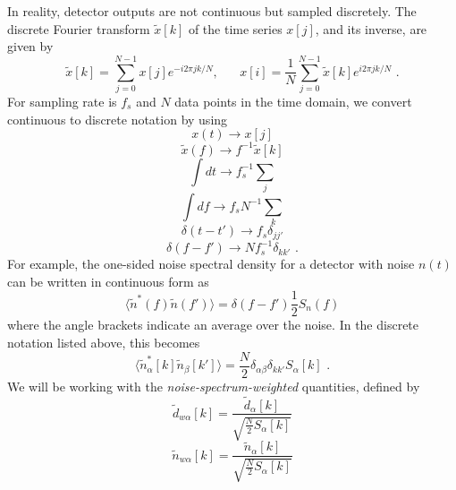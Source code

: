 \documentclass[11pt]{cuthesis}
\newcommand{\fs}{\text{ .}}
\begin{document}
In reality, detector outputs are not continuous but sampled discretely. The discrete Fourier transform $\tilde{x}[k]$ of the time series $x[j]$, and its inverse, are given by
\begin{equation}
\tilde{x}[k]=\sum^{N-1}_{j=0} x[j] e^{-i 2\pi jk/N}, \hspace{20pt}x[i]=\frac{1}{N}\sum^{N-1}_{j=0} \tilde{x}[k] e^{i2 \pi jk/N} \fs
\end{equation}
For sampling rate is $f_s$ and $N$ data points in the time domain, we convert continuous to discrete notation by using
\begin{equation}
x(t)\rightarrow x[j]
\end{equation} 
\begin{equation}
\tilde{x}(f)\rightarrow f^{-1} \tilde{x}[k]
\end{equation} 
\begin{equation}
\int dt \rightarrow f_s^{-1}\sum_j
\end{equation} 
\begin{equation}
\int df \rightarrow f_s N^{-1} \sum_k
\end{equation} 
\begin{equation}
\delta(t-t')\rightarrow f_s \delta_{jj'}
\end{equation}
\begin{equation}
\delta(f-f')\rightarrow N f_s^{-1}\delta_{kk'} \fs
\end{equation}  
For example, the one-sided noise spectral density for a detector with noise $n(t)$ can be written in continuous form as
\begin{equation}
\langle  \tilde{n}^* (f) \tilde{n} (f') \rangle = \delta (f-f') \frac{1}{2} S_n (f)
\end{equation}
where the angle brackets indicate an average over the noise. In the discrete notation listed above, this becomes
\begin{equation}
\langle  \tilde{n}^*_\alpha [k] \tilde{n}_\beta [k']  \rangle = \frac{N}{2} \delta _{\alpha \beta} \delta _{k k'} S_\alpha [k] \fs
\end{equation}
We will be working with the \emph{noise-spectrum-weighted} quantities, defined by
\begin{equation}
\tilde{d}_{w\alpha}[k]=\frac{\tilde{d}_\alpha [k]}{\sqrt{\frac{N}{2}S_\alpha [k]}}
\end{equation}
\begin{equation}
\tilde{n}_{w\alpha}[k]=\frac{\tilde{n}_\alpha [k]}{\sqrt{\frac{N}{2}S_\alpha [k]}}
\end{equation}
\end{document}
